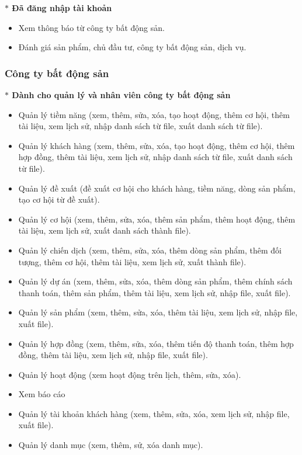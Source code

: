 \documentclass[12pt,a4paper]{article}
\begin{document}
    \textbf{$\ast$ Đã đăng nhập tài khoản}
    \begin{itemize}
        \item Xem thông báo từ công ty bất động sản.
        \item Đánh giá sản phẩm, chủ đầu tư, công ty bất động sản, dịch vụ.
    \end{itemize}
    \subsubsection*{Công ty bất động sản}
    \textbf{$\ast$ Dành cho quản lý và nhân viên công ty bất động sản}
    \begin{itemize}
        \item Quản lý tiềm năng (xem, thêm, sửa, xóa, tạo hoạt động, thêm cơ hội, thêm tài liệu,  xem lịch sử, nhập danh sách từ file, xuất danh sách từ file).
        \item Quản lý khách hàng (xem, thêm, sửa, xóa, tạo hoạt động, thêm cơ hội, thêm hợp đồng, thêm tài liệu,  xem lịch sử, nhập danh sách từ file, xuất danh sách từ file).
        \item Quản lý đề xuất (đề xuất cơ hội cho khách hàng, tiềm năng, dòng sản phẩm, tạo cơ hội từ đề xuất).
        \item Quản lý cơ hội (xem, thêm, sửa, xóa, thêm sản phẩm, thêm hoạt động, thêm tài liệu, xem lịch sử, xuất danh sách thành file).
        \item Quản lý chiến dịch (xem, thêm, sửa, xóa, thêm dòng sản phẩm, thêm đối tượng, thêm cơ hội, thêm tài liệu, xem lịch sử, xuất thành file).
        \item Quản lý dự án (xem, thêm, sửa, xóa, thêm dòng sản phẩm, thêm chính sách thanh toán, thêm sản phẩm, thêm tài liệu, xem lịch sử, nhập file, xuất file).
        \item Quản lý sản phẩm (xem, thêm, sửa, xóa, thêm tài liệu, xem lịch sử, nhập file, xuất file).
        \item Quản lý hợp đồng (xem, thêm, sửa, xóa, thêm tiến độ thanh toán, thêm hợp đồng, thêm tài liệu, xem lịch sử, nhập file, xuất file).
        \item Quản lý hoạt động (xem hoạt động trên lịch, thêm, sửa, xóa).
        \item Xem báo cáo
        \item Quản lý tài khoản khách hàng (xem, thêm, sửa, xóa, xem lịch sử, nhập file, xuất file).
        \item Quản lý danh mục (xem, thêm, sử, xóa danh mục).
    \end{itemize}
\end{document}
